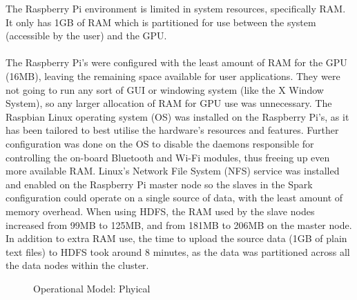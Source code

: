 \documentclass[12pt]{article} %
\begin{document}
	The Raspberry Pi environment is limited in system resources, specifically RAM. It only has 1GB of RAM which is partitioned for use between the system (accessible by the user) and the GPU.\\
	\\
	The Raspberry Pi’s were configured with the least amount of RAM for the GPU (16MB), leaving the remaining space available for user applications. They were not going to run any sort of GUI or windowing system (like the X Window System), so any larger allocation of RAM for GPU use was unnecessary.
	The Raspbian Linux operating system (OS) was installed on the Raspberry Pi’s, as it has been tailored to best utilise the hardware’s resources and features. Further configuration was done on the OS to disable the daemons responsible for controlling the on-board Bluetooth and Wi-Fi modules, thus freeing up even more available RAM.
	Linux’s Network File System (NFS) service was installed and enabled on the Raspberry Pi master node so the slaves in the Spark configuration could operate on a single source of data, with the least amount of memory overhead. When using HDFS, the RAM used by the slave nodes increased from 99MB to 125MB, and from 181MB to 206MB on the master node. In addition to extra RAM use, the time to upload the source data (1GB of plain text files) to HDFS took around 8 minutes, as the data was partitioned across all the data nodes within the cluster.
	
	
	
	
		\begin{figure}[H] %
			\caption{Operational Model: Phyical}
			\label{fig:speciation}
		\end{figure}
		
\end{document}

